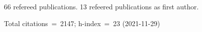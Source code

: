 66 refereed publications. 13 refeered publications as first author.

Total citations~=~2147; h-index~=~23 (2021-11-29)